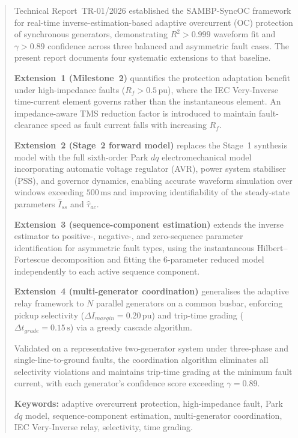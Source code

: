 \documentclass[12pt,a4paper]{article}
\theoremstyle{definition}
\theoremstyle{plain}
\newcommand{\pu}{\,\text{pu}}
\newcommand{\mss}{\,\text{ms}}
\newcommand{\sss}{\,\text{s}}
\begin{document}
\newpage
\setcounter{page}{1}
\tableofcontents
\newpage
\listoffigures
\listoftables
\newpage

\begin{abstract}
\noindent
Technical Report~TR-01/2026 established the SAMBP-SyncOC framework for
real-time inverse-estimation-based adaptive overcurrent (OC) protection of
synchronous generators, demonstrating $R^2 > 0.999$ waveform fit and
$\gamma > 0.89$ confidence across three balanced and asymmetric fault cases.
The present report documents four systematic extensions to that baseline.

\textbf{Extension~1 (Milestone~2)} quantifies the protection adaptation benefit
under high-impedance faults ($R_f > 0.5\pu$), where the IEC Very-Inverse
time-current element governs rather than the instantaneous element.  An
impedance-aware TMS reduction factor is introduced to maintain fault-clearance
speed as fault current falls with increasing $R_f$.

\textbf{Extension~2 (Stage~2 forward model)} replaces the Stage~1 synthesis
model with the full sixth-order Park $dq$ electromechanical model incorporating
automatic voltage regulator (AVR), power system stabiliser (PSS), and governor
dynamics, enabling accurate waveform simulation over windows exceeding
$500\mss$ and improving identifiability of the steady-state parameters
$\hat{I}_{ss}$ and $\hat{\tau}_{ac}$.

\textbf{Extension~3 (sequence-component estimation)} extends the inverse
estimator to positive-, negative-, and zero-sequence parameter identification
for asymmetric fault types, using the instantaneous Hilbert--Fortescue
decomposition and fitting the 6-parameter reduced model independently to each
active sequence component.

\textbf{Extension~4 (multi-generator coordination)} generalises the adaptive
relay framework to $N$ parallel generators on a common busbar, enforcing pickup
selectivity ($\Delta I_{margin} = 0.20\pu$) and trip-time grading
($\Delta t_{grade} = 0.15\sss$) via a greedy cascade algorithm.

Validated on a representative two-generator system under three-phase and
single-line-to-ground faults, the coordination algorithm eliminates all
selectivity violations and maintains trip-time grading at the minimum fault
current, with each generator's confidence score exceeding $\gamma = 0.89$.

\medskip
\noindent\textbf{Keywords:} adaptive overcurrent protection, high-impedance
fault, Park $dq$ model, sequence-component estimation, multi-generator
coordination, IEC Very-Inverse relay, selectivity, time grading.
\end{abstract}
\end{document}
